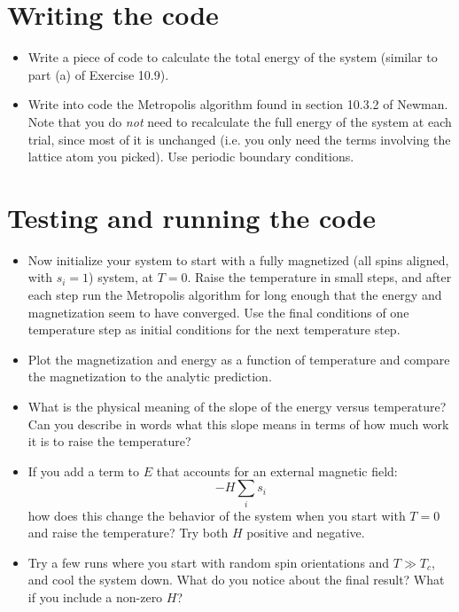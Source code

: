 \documentclass[11pt, preprint]{aastex}
\begin{document}
\section{Writing the code}

\begin{itemize}
\item Write a piece of code to calculate the total energy of the
  system (similar to part (a) of Exercise 10.9). 
\item Write into code the Metropolis algorithm found in section 10.3.2
  of Newman. Note that you do {\it not} need to recalculate the full
  energy of the system at each trial, since most of it is unchanged
  (i.e. you only need the terms involving the lattice atom you
  picked). Use periodic boundary conditions.
\end{itemize}

\section{Testing and running the code}

\begin{itemize}
\item Now initialize your system to start with a fully magnetized (all
  spins aligned, with $s_i = 1$) system, at $T=0$. Raise the
  temperature in small steps, and after each step run the Metropolis
  algorithm for long enough that the energy and magnetization seem to
  have converged. Use the final conditions of one temperature step as
  initial conditions for the next temperature step.
\item Plot the magnetization and energy as a function of temperature
  and compare the magnetization to the analytic prediction.
\item What is the physical meaning of the slope of the energy versus
  temperature?  Can you describe in words what this slope means in
  terms of how much work it is to raise the temperature?
\item If you add a term to $E$ that accounts for an external magnetic
  field:
  \begin{equation}
    -H \sum_i s_i
  \end{equation}
  how does this change the behavior of the system when you start with
  $T=0$ and raise the temperature?  Try both $H$ positive and
  negative.
\item Try a few runs where you start with random spin orientations and
  $T\gg T_c$, and cool the system down. What do you notice about the
  final result? What if you include a non-zero $H$?
\end{itemize}
\end{document}

